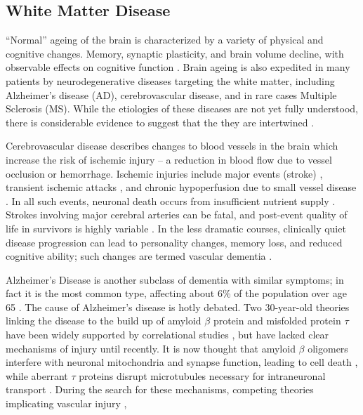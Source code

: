 \subsection{White Matter Disease}\label{ss:WMD}
``Normal'' ageing of the brain is characterized by a variety of physical and cognitive changes.
Memory, synaptic plasticity, and brain volume decline,
with observable effects on cognitive function \cite{Peters2006,Good2002}.
Brain ageing is also expedited in many patients by neurodegenerative diseases
targeting the white matter, including
Alzheimer's disease (AD), cerebrovascular disease, and in rare cases Multiple Sclerosis (MS).
While the etiologies of these diseases are not yet fully understood,
there is considerable evidence to suggest that the they are intertwined
\cite{Debette2010,Conklin2014,Heppner2015,Snyder2015}.
\par
Cerebrovascular disease describes changes to blood vessels in the brain which increase the risk of
ischemic injury -- a reduction in blood flow due to vessel occlusion or hemorrhage.
Ischemic injuries include
major events (stroke) \cite{VanderWorp2007},
transient ischemic attacks \cite{Albers2002}, and
chronic hypoperfusion due to small vessel disease \cite{Pantoni2010}.
In all such events, neuronal death occurs from insufficient nutrient supply \cite{VanderWorp2007}.
Strokes involving major cerebral arteries can be fatal,
and post-event quality of life in survivors is highly variable \cite{Prabhakaran2015}.
In the less dramatic courses, clinically quiet disease progression can lead to
personality changes, memory loss, and reduced cognitive ability;
such changes are termed vascular dementia \cite{Roman1993}.
\par
Alzheimer's Disease is another subclass of dementia with similar symptoms;
in fact it is the most common type,
affecting about 6\% of the population over age 65 \cite{Burns2009}.
The cause of Alzheimer's disease is hotly debated.
Two 30-year-old theories linking the disease to
the build up of amyloid $\beta$ protein and misfolded protein $\tau$
have been widely supported by correlational studies \cite{Masters1985,Hardy2002,Lee2011},
but have lacked clear mechanisms of injury until recently.
It is now thought that amyloid $\beta$ oligomers interfere with
neuronal mitochondria and synapse function, leading to cell death \cite{Kim2013,Tu2014},
while aberrant $\tau$ proteins disrupt microtubules
necessary for intraneuronal transport \cite{Lee2011}.
During the search for these mechanisms, competing theories implicating
vascular injury \cite{Snyder2015},
